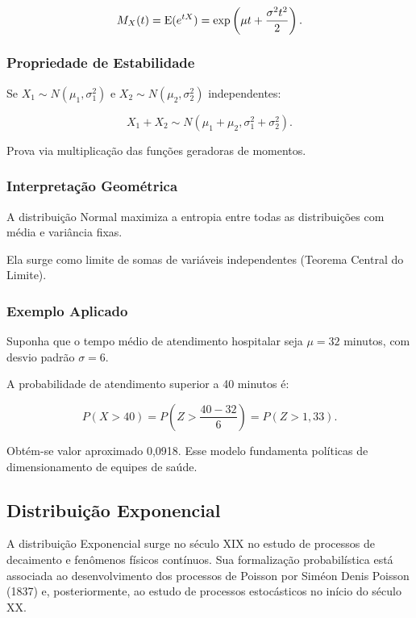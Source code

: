 \[
M_X(t)
=
\operatorname{E}(e^{tX})
=
\exp\left(
\mu t + \frac{\sigma^2 t^2}{2}
\right).
\]


\subsubsection{Propriedade de Estabilidade}

Se $X_1\sim N(\mu_1,\sigma_1^2)$ e
$X_2\sim N(\mu_2,\sigma_2^2)$ independentes:

\[
X_1+X_2
\sim
N(\mu_1+\mu_2,
\sigma_1^2+\sigma_2^2).
\]

Prova via multiplicação das funções geradoras de momentos.

\subsubsection{Interpretação Geométrica}

A distribuição Normal maximiza a entropia entre todas as distribuições com média e variância fixas.\vskip0.3cm

Ela surge como limite de somas de variáveis independentes
(Teorema Central do Limite).

\subsubsection*{Exemplo Aplicado}

Suponha que o tempo médio de atendimento hospitalar
seja $\mu=32$ minutos, com desvio padrão $\sigma=6$. \vskip0.3cm

A probabilidade de atendimento superior a 40 minutos é:

\[
P(X>40)
=
P\left(
Z>
\frac{40-32}{6}
\right)
=
P(Z>1,33).
\]

Obtém-se valor aproximado 0,0918. Esse modelo fundamenta políticas de dimensionamento
de equipes de saúde.

\newpage
\subsection{Distribuição Exponencial}

A distribuição Exponencial surge no século XIX no estudo
de processos de decaimento e fenômenos físicos contínuos.
Sua formalização probabilística está associada ao desenvolvimento
dos processos de Poisson por Siméon Denis Poisson (1837)
e, posteriormente, ao estudo de processos estocásticos
no início do século XX. \vskip0.3cm

